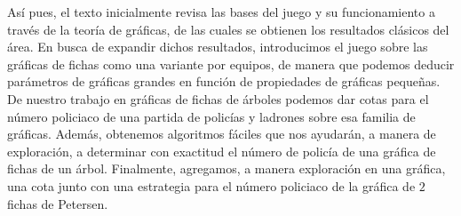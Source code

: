 As\'i pues, el texto inicialmente revisa las bases del juego y su funcionamiento
a trav\'es de la teor\'ia de gr\'aficas, de las cuales se obtienen los
resultados cl\'asicos del \'area. En busca de expandir dichos resultados,
introducimos el juego sobre las gr\'aficas de fichas como una variante por
equipos, de manera que podemos deducir par\'ametros de gr\'aficas grandes en
funci\'on de propiedades de gr\'aficas peque\~nas. De nuestro trabajo en
gr\'aficas de fichas de \'arboles podemos dar cotas para el n\'umero policiaco
de una partida de polic\'ias y ladrones sobre esa familia de gr\'aficas.
Adem\'as, obtenemos algoritmos f\'aciles que nos ayudar\'an, a manera de
exploraci\'on, a determinar con exactitud el n\'umero de polic\'ia de una
gr\'afica de fichas de un \'arbol. Finalmente, agregamos, a manera exploraci\'on
en una gr\'afica, una cota junto con una estrategia para el n\'umero policiaco
de la gr\'afica de $2$ fichas de Petersen.